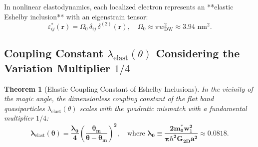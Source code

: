 \documentclass[12pt,a4paper]{article}
\newtheorem{theorem}{Theorem}
\begin{document}
					In nonlinear elastodynamics, each localized electron represents an **elastic Eshelby inclusion** with an eigenstrain tensor:
					\begin{equation}
						\varepsilon_{ij}^*(\mathbf{r}) = \Omega_0 \, \delta_{ij} \, \delta^{(2)}(\mathbf{r}), \quad \Omega_0 \approx \pi w_{\text{DW}}^2 \approx 3.94\text{ nm}^2.
					\end{equation}
					
					\subsection{Coupling Constant $\lambda_{\text{elast}}(\theta)$ Considering the Variation Multiplier $1/4$}
					\begin{theorem}[Elastic Coupling Constant of Eshelby Inclusions]
						In the vicinity of the magic angle, the dimensionless coupling constant of the flat band quasiparticles $\lambda_{\mathrm{elast}}(\theta)$ scales with the quadratic mismatch with a fundamental multiplier $1/4$:
						\begin{equation}
							\mathbf{\lambda_{\mathrm{elast}}(\theta) = \frac{\lambda_0}{4} \left( \frac{\theta_m}{\theta - \theta_m} \right)^2}, \quad \text{where } \mathbf{\lambda_0 \equiv \frac{2 m_0^* w_1^2}{\pi \hbar^2 G_{2D} a^2} \approx 0.0818}.
						\end{equation}
						\end{theorem}
						
\end{document}
